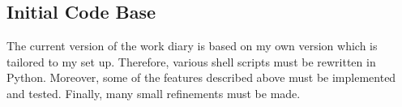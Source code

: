\subsection{Initial Code Base}
\label{task:20140315_jkn1}
The current version of the work diary is based on my own version which is tailored to my set up. Therefore, various shell scripts must be rewritten in Python. Moreover, some of the features described above must be implemented and tested. Finally, many small refinements must be made.
